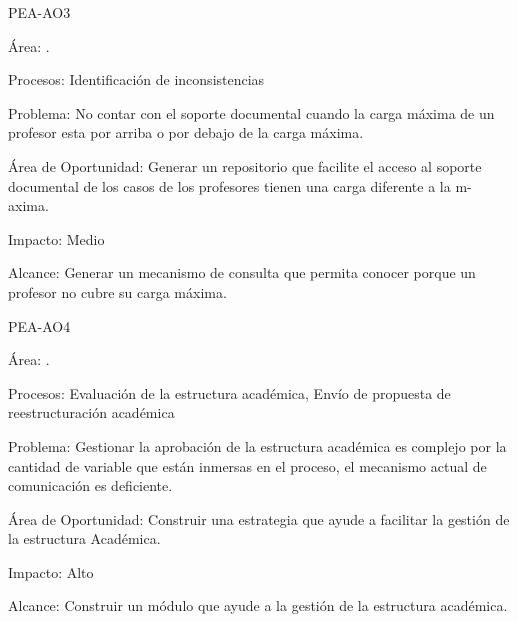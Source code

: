 %
\begin{AreaOportunidad}{PEA-AO3}
	\item[Área:] .
	\item[Procesos:] Identificación de inconsistencias
	\item[Problema:] No contar con el soporte documental cuando la carga máxima de un profesor esta por arriba o por debajo de la carga máxima.
	\item[Área de Oportunidad:]Generar un repositorio que facilite el acceso al soporte documental de los casos de los profesores tienen una carga diferente a la m-axima.
	\item[Impacto:] Medio
	\item[Alcance:] Generar un mecanismo de consulta que permita conocer porque un profesor no cubre su carga máxima.
\end{AreaOportunidad}
%
%
%



\begin{AreaOportunidad}{PEA-AO4}
	\item[Área:] .
	\item[Procesos:] Evaluación de la estructura académica, Envío de propuesta de reestructuración académica
	\item[Problema:] Gestionar la aprobación de la estructura académica es complejo por la cantidad de variable que están inmersas en el proceso, el mecanismo actual de comunicación es deficiente.
	\item[Área de Oportunidad:]Construir una estrategia que ayude a facilitar la gestión de la estructura Académica.
	\item[Impacto:] Alto
	\item[Alcance:] Construir un módulo que ayude a la gestión de la estructura académica.
\end{AreaOportunidad}



